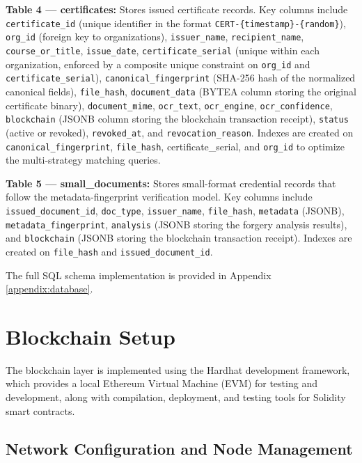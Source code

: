 \textbf{Table 4 --- certificates:} Stores issued certificate records. Key columns include \texttt{certificate\_id} (unique identifier in the format \texttt{CERT-\{timestamp\}-\{random\}}), \texttt{org\_id} (foreign key to organizations), \texttt{issuer\_name}, \texttt{recipient\_name}, \texttt{course\_or\_title}, \texttt{issue\_date}, \texttt{certificate\_serial} (unique within each organization, enforced by a composite unique constraint on \texttt{org\_id} and \texttt{certificate\_serial}), \texttt{canonical\_fingerprint} (SHA-256 hash of the normalized canonical fields), \texttt{file\_hash}, \texttt{document\_data} (BYTEA column storing the original certificate binary), \texttt{document\_mime}, \texttt{ocr\_text}, \texttt{ocr\_engine}, \texttt{ocr\_confidence}, \texttt{blockchain} (JSONB column storing the blockchain transaction receipt), \texttt{status} (active or revoked), \texttt{revoked\_at}, and \texttt{revocation\_reason}. Indexes are created on \texttt{canonical\_fingerprint}, \texttt{file\_hash}, {certificate\_serial}, and \texttt{org\_id} to optimize the multi-strategy matching queries.

\textbf{Table 5 --- small\_documents:} Stores small-format credential records that follow the metadata-fingerprint verification model. Key columns include \texttt{issued\_document\_id}, \texttt{doc\_type}, \texttt{issuer\_name}, \texttt{file\_hash}, \texttt{metadata} (JSONB), \texttt{metadata\_fingerprint}, \texttt{analysis} (JSONB storing the forgery analysis results), and \texttt{blockchain} (JSONB storing the blockchain transaction receipt). Indexes are created on \texttt{file\_hash} and \texttt{issued\_document\_id}.

The full SQL schema implementation is provided in Appendix \ref{appendix:database}.

\section{Blockchain Setup}

The blockchain layer is implemented using the Hardhat development framework, which provides a local Ethereum Virtual Machine (EVM) for testing and development, along with compilation, deployment, and testing tools for Solidity smart contracts.

\subsection{Network Configuration and Node Management}

